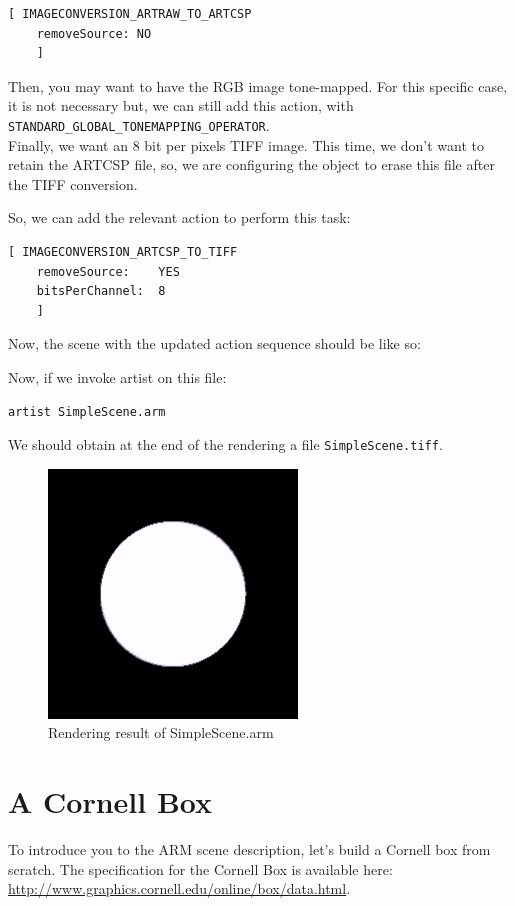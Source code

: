\documentclass[a4paper,chapterprefix]{scrbook}
\begin{document}
\begin{lstlisting}
[ IMAGECONVERSION_ARTRAW_TO_ARTCSP
    removeSource: NO
    ]
\end{lstlisting}

Then, you may want to have the RGB image tone-mapped. For this specific case, it is not necessary but, we can still add this action, with \verb?STANDARD_GLOBAL_TONEMAPPING_OPERATOR?. 
\\

Finally, we want an 8 bit per pixels TIFF image. This time, we don't want to retain the ARTCSP file, so, we are configuring the object to erase this file after the TIFF conversion.

So, we can add the relevant action to perform this task:
\begin{lstlisting}
[ IMAGECONVERSION_ARTCSP_TO_TIFF
    removeSource:    YES
    bitsPerChannel:  8
    ]
\end{lstlisting}

Now, the scene with the updated action sequence should be like so:



Now, if we invoke artist on this file:
\begin{verbatim}
artist SimpleScene.arm
\end{verbatim}

We should obtain at the end of the rendering a file \verb?SimpleScene.tiff?.

\begin{figure}[h]
	\centering
	\includegraphics[width=0.2\linewidth]{Example_Scene/SimpleScene.png}
	\caption{Rendering result of SimpleScene.arm}
\end{figure}


\chapter{A Cornell Box}
To introduce you to the ARM scene description, let's build a Cornell box from scratch. The specification for the Cornell Box is available here: \url{http://www.graphics.cornell.edu/online/box/data.html}.
\end{document}
